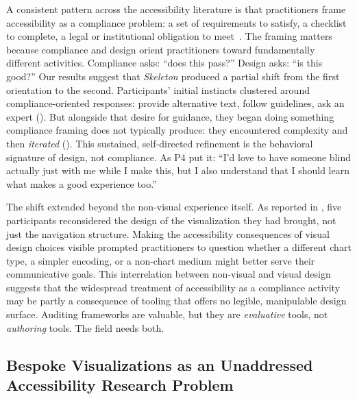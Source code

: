 \documentclass[12pt]{cmuthesis}
\begin{document}
A consistent pattern across the accessibility literature is that practitioners frame accessibility as a compliance problem: a set of requirements to satisfy, a checklist to complete, a legal or institutional obligation to meet~\cite{Joyner2022Wild, Sharif2024Challenges, Elavsky2022Chartability}. The framing matters because compliance and design orient practitioners toward fundamentally different activities. Compliance asks: ``does this pass?'' Design asks: ``is this good?'' Our results suggest that \textit{Skeleton} produced a partial shift from the first orientation to the second. Participants' initial instincts clustered around compliance-oriented responses: provide alternative text, follow guidelines, ask an expert (). But alongside that desire for guidance, they began doing something compliance framing does not typically produce: they encountered complexity and then \textit{iterated} (). This sustained, self-directed refinement is the behavioral signature of design, not compliance. As P4 put it: ``I'd love to have someone blind actually just with me while I make this, but I also understand that I should learn what makes a good experience too.''

The shift extended beyond the non-visual experience itself. As reported in , five participants reconsidered the design of the visualization they had brought, not just the navigation structure. Making the accessibility consequences of visual design choices visible prompted practitioners to question whether a different chart type, a simpler encoding, or a non-chart medium might better serve their communicative goals. This interrelation between non-visual and visual design suggests that the widespread treatment of accessibility as a compliance activity may be partly a consequence of tooling that offers no legible, manipulable design surface. Auditing frameworks are valuable, but they are \textit{evaluative} tools, not \textit{authoring} tools. The field needs both.

\subsection{Bespoke Visualizations as an Unaddressed Accessibility Research Problem}

\end{document}

